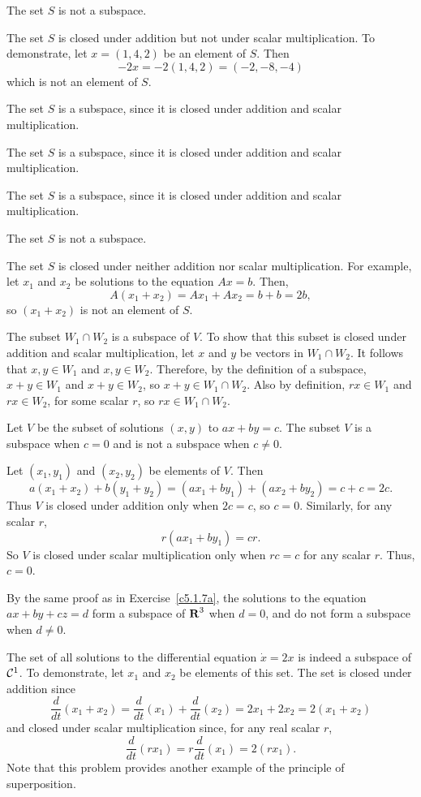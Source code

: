 \documentclass{ximera}
\begin{document}
 \ans The set $S$ is not a subspace.

\soln The set $S$ is closed under addition but not under scalar
multiplication.  To demonstrate, let $x = (1,4,2)$ be an element of $S$. 
Then
\[
-2x = -2(1,4,2) = (-2,-8,-4)
\]
which is not an element of $S$.

 The set $S$ is a subspace, since it is closed under
addition and scalar multiplication.

\newpage 
{} The set $S$ is a subspace, since it is closed under
addition and scalar multiplication.

 The set $S$ is a subspace, since it is closed under
addition and scalar multiplication.

 \ans The set $S$ is not a subspace.

\soln The set $S$ is closed under neither addition nor scalar
multiplication.  For example, let $x_1$ and $x_2$ be solutions to the
equation $Ax = b$.  Then,
\[
A(x_1 + x_2) = Ax_1 + Ax_2 = b + b = 2b,
\]
so $(x_1 + x_2)$ is not an element of $S$.

The subset $W_1 \cap W_2$ is a subspace of $V$.  To show that this
subset is closed under addition and scalar multiplication, 
let $x$ and $y$ be vectors in $W_1 \cap W_2$.  It follows that
$x,y \in W_1$ and $x,y \in W_2$.  Therefore, by the
definition of a subspace, $x + y \in W_1$ and $x + y \in W_2$, so
$x + y \in W_1 \cap W_2$.  Also by definition, $rx \in W_1$ and
$rx \in W_2$, for some scalar $r$, so $rx \in W_1 \cap W_2$.

\ans Let $V$ be the subset of solutions $(x,y)$ to $ax + by = c$.
The subset $V$ is a subspace when $c = 0$ and is not a subspace
when $c \neq 0$. 

\soln Let $(x_1,y_1)$ and $(x_2,y_2)$ be elements of $V$.  Then
\[
a(x_1 + x_2) + b(y_1 + y_2) = (ax_1 + by_1) + (ax_2 + by_2) =
c + c = 2c.
\]
Thus $V$ is closed under addition only when $2c = c$, so $c = 0$.
Similarly, for any scalar $r$,
\[
r(ax_1 + by_1) = cr.
\]
So $V$ is closed under scalar multiplication only when $rc = c$ for
any scalar $r$.  Thus, $c = 0$.

\ans By the same proof as in Exercise~\ref{c5.1.7a}, the solutions to the
equation $ax + by + cz = d$ form a subspace of $\mbox{$\bf{R}$}^3$ when $d = 0$,
and do not form a subspace when $d \neq 0$.

The set of all solutions to the differential equation $\dot{x} = 2x$ is
indeed a subspace of ${\cal C}^1$.  To demonstrate, let $x_1$ and $x_2$
be elements of this set.  The set is closed under addition since
\[
\frac{d}{dt}(x_1 + x_2) = \frac{d}{dt}(x_1) + \frac{d}{dt}(x_2)
= 2x_1 + 2x_2 = 2(x_1 + x_2)
\]
and closed under scalar multiplication since, for any real scalar $r$,
\[
\frac{d}{dt}(rx_1) = r\frac{d}{dt}(x_1) = 2(rx_1).
\]
Note that this problem provides another example of the principle of
superposition.
\end{document}
